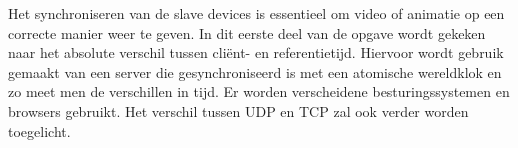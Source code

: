 Het synchroniseren van de slave devices is essentieel om video of animatie op een correcte manier weer te geven. In dit eerste deel van de opgave wordt gekeken naar het absolute verschil tussen cliënt- en referentietijd. Hiervoor wordt gebruik gemaakt van een server die gesynchroniseerd is met een atomische wereldklok en zo meet men de verschillen in tijd. Er worden verscheidene besturingssystemen en browsers gebruikt. Het verschil tussen UDP en TCP zal ook verder worden toegelicht. 